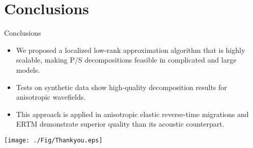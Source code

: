 \documentclass[aspectratio=43]{beamer}
\begin{document}
\section{Conclusions}
\begin{frame}{Conclusions}
\begin{itemize}
\item{We proposed a localized low-rank approximation algorithm that is highly scalable, making P/S decompositions feasible in complicated and large models.
}
\item{
Tests on synthetic data show high-quality decomposition results for anisotropic wavefields.
}
\item{
This approach is applied in anisotropic elastic reverse-time migrations and ERTM demonstrate superior quality than its acoustic counterpart.
}
\end{itemize}
\end{frame}

\begin{frame}
\begin{center}
  \texttt{[image: ./Fig/Thankyou.eps]}
\end{center}
\end{frame}
\end{document}
